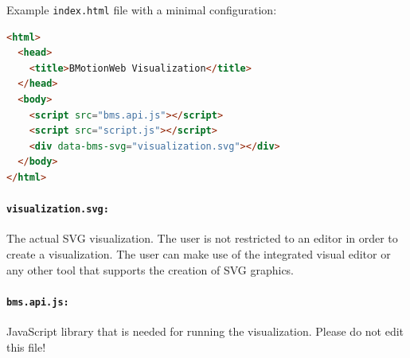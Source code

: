 Example \texttt{index.html} file with a minimal configuration:

\begin{lstlisting}[language=html]
<html>
  <head>
    <title>BMotionWeb Visualization</title>
  </head>
  <body>
    <script src="bms.api.js"></script>
    <script src="script.js"></script>
    <div data-bms-svg="visualization.svg"></div>
  </body>
</html>
\end{lstlisting}


\paragraph{\texttt{visualization.svg:}}


The actual SVG visualization.
The user is not restricted to an editor in order to create a visualization.
The user can make use of the integrated visual editor or any other tool that supports the creation of SVG graphics.

\paragraph{\texttt{bms.api.js:}}
JavaScript library that is needed for running the visualization.
Please do not edit this file!

%

